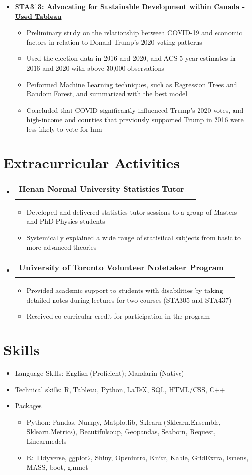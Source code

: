 \documentclass[letterpaper]{article}
\makeatletter
\newcommand{\resumeItem}[1]{
  \renewcommand{\labelitemi}{-} %
  \item{\fontsize{12}{12}\selectfont
    {#1 \vspace{-1.5pt}}
  }
}
\newcommand{\resumeItemcircle}[1]{
  \renewcommand{\labelitemi}{\textbullet} %
  \item{\fontsize{12}{12}\selectfont
    {#1 \vspace{-7pt}}
  }
}
\newcommand{\resumeSubheading}[4]{
  \vspace{-3pt}\item
    \begin{tabular*}{1.0\textwidth}[t]{l@{\extracolsep{\fill}}r}
      {\fontsize{12}{12}\selectfont\textbf{#1}} & {\fontsize{12}{12}\selectfont{#2}} \\
      {\fontsize{12}{12}\selectfont\textit{#3}} & {\fontsize{12}{12}\selectfont\textit{#4}} \\
    \end{tabular*}\vspace{-7pt}
}
\newcommand{\resumeSubheadingsingle}[1]{
  \vspace{-3pt}\item
      {\fontsize{12}{12}\selectfont\textbf{#1}}\\
  \vspace{-7pt}
}
\newcommand{\resumeSubHeadingListStart}{\begin{itemize}[leftmargin=0.0in, label={}]}
\newcommand{\resumeSubHeadingListEnd}{\end{itemize}}
\newcommand{\resumeItemListStart}{\begin{itemize}}
\newcommand{\resumeItemListEnd}{\end{itemize}\vspace{-5pt}}
\makeatother
\begin{document}
\resumeSubHeadingListStart
\resumeSubheadingsingle
{\href{https://public.tableau.com/views/STA313FinalProjectProduct/FinalProduct?:language=en-US&:display_count=n&:origin=viz_share_link}{STA313: Advocating for Sustainable Development within Canada - Used Tableau}}
\resumeItemListStart
\resumeItem{Preliminary study on the relationship between COVID-19 and economic factors in relation to Donald Trump's 2020 voting patterns}
\resumeItem{Used the election data in 2016 and 2020, and ACS 5-year estimates in 2016 and 2020 with above 30,000 observations}
\resumeItem{Performed Machine Learning techniques, such as Regression Trees and Random Forest, and summarized with the best model}
\resumeItem{Concluded that COVID significantly influenced Trump's 2020 votes, and high-income and counties that previously supported Trump in 2016 were less likely to vote for him}
\resumeItemListEnd
\resumeSubHeadingListEnd
\vspace{-5pt}

\section{Extracurricular Activities}
\resumeSubHeadingListStart
\resumeSubheading
{Henan Normal University Statistics Tutor}{\textit{Jun 2023 - Jul 2023}}{}{}
\resumeItemListStart
\vspace{-5mm}
\resumeItem{Developed and delivered statistics tutor sessions to a group of Masters and PhD Physics students}
\resumeItem{Systemically explained a wide range of statistical subjects from basic to more advanced theories}
\resumeItemListEnd
\resumeSubHeadingListEnd

\resumeSubHeadingListStart
\resumeSubheading
{University of Toronto Volunteer Notetaker Program}{\textit{Jan 2023 - Apr 2023}}{}{}
\resumeItemListStart
\vspace{-5mm}
\resumeItem{Provided academic support to students with disabilities by taking detailed notes during lectures for two courses (STA305 and STA437)}
\resumeItem{Received co-curricular credit for participation in the program}
\resumeItemListEnd
\resumeSubHeadingListEnd
\vspace{-5pt}

\section{Skills}
\resumeItemListStart
\resumeItemcircle{Language Skills: English (Proficient); Mandarin (Native)}
\resumeItemcircle{Technical skills: R, Tableau, Python, LaTeX, SQL, HTML/CSS, C++}
\resumeItemcircle{Packages}
\resumeItemListStart
\resumeItem{Python: Pandas, Numpy, Matplotlib, Sklearn (Sklearn.Ensemble, Sklearn.Metrics), Beautifulsoup, Geopandas, Seaborn, Request, Linearmodels}
\resumeItem{R: Tidyverse, ggplot2, Shiny, Openintro, Knitr, Kable, GridExtra, lsmens, MASS, boot, glmnet}
\resumeItemListEnd

\resumeItemListEnd
\end{document}
